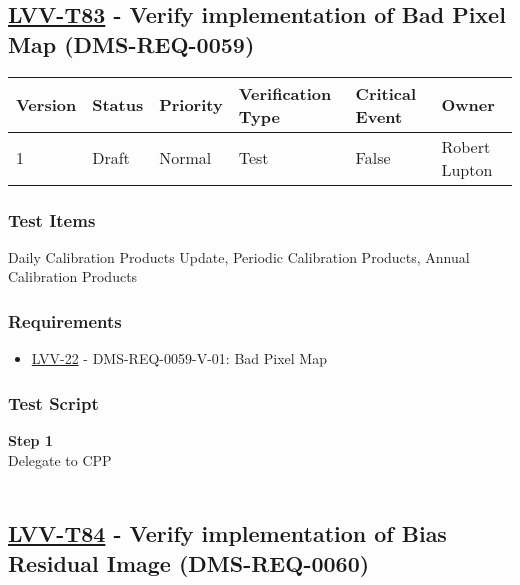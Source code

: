 \hypertarget{lvv-t83---verify-implementation-of-bad-pixel-map-dms-req-0059}{%
\subsection{\texorpdfstring{\href{https://jira.lsstcorp.org/secure/Tests.jspa\#/testCase/LVV-T83}{LVV-T83}
- Verify implementation of Bad Pixel Map
(DMS-REQ-0059)}{LVV-T83 - Verify implementation of Bad Pixel Map (DMS-REQ-0059)}}\label{lvv-t83---verify-implementation-of-bad-pixel-map-dms-req-0059}}

\begin{longtable}[]{@{}llllll@{}}
\toprule
Version & Status & Priority & Verification Type & Critical Event &
Owner\tabularnewline
\midrule
\endhead
1 & Draft & Normal & Test & False & Robert Lupton\tabularnewline
\bottomrule
\end{longtable}

\hypertarget{test-items-59}{%
\subsubsection{Test Items}\label{test-items-59}}

Daily Calibration Products Update, Periodic Calibration Products, Annual
Calibration Products

\hypertarget{requirements-60}{%
\subsubsection{Requirements}\label{requirements-60}}

\begin{itemize}
\tightlist
\item
  \href{https://jira.lsstcorp.org/browse/LVV-22}{LVV-22} -
  DMS-REQ-0059-V-01: Bad Pixel Map
\end{itemize}

\hypertarget{test-script-60}{%
\subsubsection{Test Script}\label{test-script-60}}

\textbf{Step 1}\\
Delegate to CPP\\
~\\

\hypertarget{lvv-t84---verify-implementation-of-bias-residual-image-dms-req-0060}{%
\subsection{\texorpdfstring{\href{https://jira.lsstcorp.org/secure/Tests.jspa\#/testCase/LVV-T84}{LVV-T84}
- Verify implementation of Bias Residual Image
(DMS-REQ-0060)}{LVV-T84 - Verify implementation of Bias Residual Image (DMS-REQ-0060)}}\label{lvv-t84---verify-implementation-of-bias-residual-image-dms-req-0060}}

